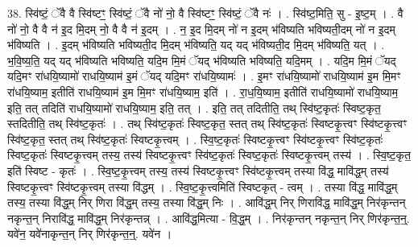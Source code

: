 \documentclass[17pt]{extarticle}
\begin{document}
38. स्वि॑ष्टं॒ ॅवै वै स्वि॑ष्टꣳ॒॒ स्वि॑ष्टं॒ ॅवै नो॑ नो॒ वै स्वि॑ष्टꣳ॒॒ स्वि॑ष्टं॒ ॅवै नः॑ । . स्वि॑ष्ट॒मिति॒ सु - इ॒ष्ट॒म् । . वै नो॑ नो॒ वै वै न॑ इ॒द मि॒दम् नो॒ वै वै न॑ इ॒दम् । . न॒ इ॒द मि॒दम् नो॑ न इ॒दम् भ॑विष्यति भविष्यती॒दम् नो॑ न इ॒दम् भ॑विष्यति । . इ॒दम् भ॑विष्यति भविष्यती॒द मि॒दम् भ॑विष्यति॒ यद् यद् भ॑विष्यती॒द मि॒दम् भ॑विष्यति॒ यत् । . भ॒वि॒ष्य॒ति॒ यद् यद् भ॑विष्यति भविष्यति॒ यदि॒म मि॒मं ॅयद् भ॑विष्यति भविष्यति॒ यदि॒मम् । . यदि॒म मि॒मं ॅयद् यदि॒मꣳ रा॑धयि॒ष्यामो॑ राधयि॒ष्याम॑ इ॒मं ॅयद् यदि॒मꣳ रा॑धयि॒ष्यामः॑ । . इ॒मꣳ रा॑धयि॒ष्यामो॑ राधयि॒ष्याम॑ इ॒म मि॒मꣳ रा॑धयि॒ष्याम॒ इतीति॑ राधयि॒ष्याम॑ इ॒म मि॒मꣳ रा॑धयि॒ष्याम॒ इति॑ । . रा॒ध॒यि॒ष्याम॒ इतीति॑ राधयि॒ष्यामो॑ राधयि॒ष्याम॒ इति॒ तत् तदिति॑ राधयि॒ष्यामो॑ राधयि॒ष्याम॒ इति॒ तत् । . इति॒ तत् तदितीति॒ तथ् स्वि॑ष्ट॒कृतः॑ स्विष्ट॒कृत॒ स्तदितीति॒ तथ् स्वि॑ष्ट॒कृतः॑ । . तथ् स्वि॑ष्ट॒कृतः॑ स्विष्ट॒कृत॒ स्तत् तथ् स्वि॑ष्ट॒कृतः॑ स्विष्टकृ॒त्त्वꣳ स्वि॑ष्टकृ॒त्त्वꣳ स्वि॑ष्ट॒कृत॒ स्तत् तथ् स्वि॑ष्ट॒कृतः॑ स्विष्टकृ॒त्त्वम् । . स्वि॒ष्ट॒कृतः॑ स्विष्टकृ॒त्त्वꣳ स्वि॑ष्टकृ॒त्त्वꣳ स्वि॑ष्ट॒कृतः॑ स्विष्ट॒कृतः॑ स्विष्टकृ॒त्त्वम् तस्य॒ तस्य॑ स्विष्टकृ॒त्त्वꣳ स्वि॑ष्ट॒कृतः॑ स्विष्ट॒कृतः॑ स्विष्टकृ॒त्त्वम् तस्य॑ । . स्वि॒ष्ट॒कृत॒ इति॑ स्विष्ट - कृतः॑ । . स्वि॒ष्ट॒कृ॒त्त्वम् तस्य॒ तस्य॑ स्विष्टकृ॒त्त्वꣳ स्वि॑ष्टकृ॒त्त्वम् तस्या वि॑द्ध॒ मावि॑द्ध॒म् तस्य॑ स्विष्टकृ॒त्त्वꣳ स्वि॑ष्टकृ॒त्त्वम् तस्या वि॑द्धम् । . स्वि॒ष्ट॒कृ॒त्त्वमिति॑ स्विष्टकृत् - त्वम् । . तस्या वि॑द्ध॒ मावि॑द्ध॒म् तस्य॒ तस्या वि॑द्ध॒म् निर् णिरा वि॑द्ध॒म् तस्य॒ तस्या वि॑द्ध॒म् निः । . आवि॑द्ध॒म् निर् णिरावि॑द्ध॒ मावि॑द्ध॒म् निर॑कृन्तन् नकृन्त॒न् निरावि॑द्ध॒ मावि॑द्ध॒म् निर॑कृन्तन्न् । . आवि॑द्ध॒मित्या - वि॒द्ध॒म् । . निर॑कृन्तन् नकृन्त॒न् निर् णिर॑कृन्त॒न्॒. यवे॑न॒ यवे॑नाकृन्त॒न् निर् णिर॑कृन्त॒न्॒. यवे॑न । \newline
\pagebreak
{}
\end{document}
